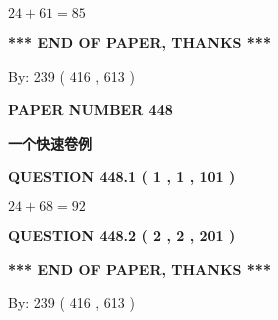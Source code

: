 \documentclass{ctexart}
\begin{document}
 

$ %
24 +  %
61=   %
85$
 
 
   
   
 \vspace{0.2in}
 
   
   
   
   
\vspace{1.0in} 
{\textbf{\large{ *** END OF PAPER, THANKS *** }}} 
   
   
\hspace{1.0in} By: 
 239 ( 416 ,  613 )
   
   
   
   
\newpage 
\setcounter{page}{ 
   448001 } 
   
   
   
   
 {\textbf{ \Large{ PAPER NUMBER  448  }}}
   
   
\vspace{0.2in}
   
   
   
   
   
   
 \vspace{0.2in}
{\LARGE {\textbf{ 一个快速卷例}}}
   
   
  
\vspace{0.2in}
  
{\textbf{\Large{QUESTION
448.1 
 ( 1 , 1 , 101 )
}}}
  
  
 
 

$ %
24 +  %
68=   %
92$
 
 
  
\vspace{0.2in}
  
{\textbf{\Large{QUESTION
448.2 
 ( 2 , 2 , 201 )
}}}
  
  
   
   
 \vspace{0.2in}
 
   
   
   
   
\vspace{1.0in} 
{\textbf{\large{ *** END OF PAPER, THANKS *** }}} 
   
   
\hspace{1.0in} By: 
 239 ( 416 ,  613 )
   
   
   
\end{document}

